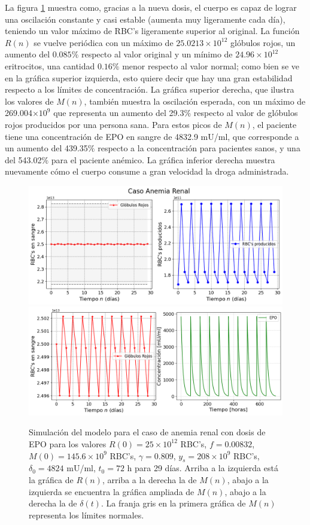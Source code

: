 La figura \ref{sec:variaciones:fig:Anemia2} muestra como, gracias a la nueva dosis, el cuerpo es capaz de lograr una oscilación constante y casi estable (aumenta muy ligeramente cada día), teniendo un valor máximo de RBC's ligeramente superior al original. La función $R(n)$ se vuelve periódica con un máximo de $25.0213\times 10^{12}$ glóbulos rojos, un aumento del $0.085\%$ respecto al valor original y un mínimo de $24.96\times 10^{12}$ eritrocitos, una cantidad $0.16\%$ menor respecto al valor normal; como bien se ve en la gráfica superior izquierda, esto quiere decir que hay una gran estabilidad respecto a los límites de concentración. La gráfica superior derecha, que ilustra los valores de $M(n)$, también muestra la oscilación esperada, con un máximo de 269.004$\times 10^{9}$ que representa un aumento del 29.3$\%$ respecto al valor de glóbulos rojos producidos por una persona sana. Para estos picos de $M(n)$, el paciente tiene una concentración de EPO en sangre de 4832.9 mU/ml, que corresponde a un aumento del 439.35$\%$ respecto a la concentración para pacientes sanos, y una del 543.02$\%$ para el paciente anémico. La gráfica inferior derecha muestra nuevamente cómo el cuerpo consume a gran velocidad la droga administrada. 

\begin{figure}[H]
    \centering
    \captionsetup{justification=centering}
    \includegraphics[scale=0.526]{figures/AR21.png}
    \includegraphics[scale=0.526]{figures/AR22.png}
    \caption{Simulación del modelo para el caso de anemia renal con dosis de EPO para los valores $R(0)=25\times 10^{12}$ RBC's, $f=0.00832$, $M(0)=145.6\times 10^{9}$ RBC's, $\gamma = 0.809$, $y_s = 208\times10^{9}$ RBC's, $\delta_0 = 4824$ mU/ml, $t_0 =72$ h para 29 días. Arriba a la izquierda está la gráfica de $R(n)$, arriba a la derecha la de $M(n)$, abajo a la izquierda se encuentra la gráfica ampliada de $M(n)$, abajo a la derecha la de $\delta(t)$. La franja gris en la primera gráfica de $M(n)$ representa los límites normales.}
    \label{sec:variaciones:fig:Anemia2}
\end{figure}

